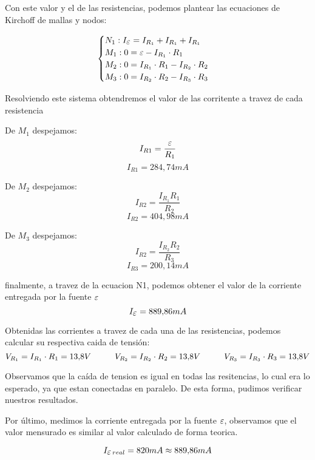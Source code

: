 \documentclass[12pt]{report}
\newcommand {\LEpsilon}{\mathlarger\varepsilon}
\begin{document}
Con este valor y el de las resistencias, podemos plantear las ecuaciones de Kirchoff de mallas y
nodos:

\[
\begin{cases}
  N_1 : I_{\LEpsilon} = I_{R_1} + I_{R_1} + I_{R_1} \\
  M_1 : 0 = \LEpsilon - I_{R_1} \cdot R_1 \\
  M_2 : 0 = I_{R_1} \cdot R_1 - I_{R_2} \cdot R_2 \\
  M_3 : 0 = I_{R_2} \cdot R_2 - I_{R_3} \cdot R_3
\end{cases}
\]

Resolviendo este sistema obtendremos el valor de las corritente a travez de cada resistencia

\noindent
\begin{minipage}[t]{0.33\textwidth}
  \centering
  De $M_1$ despejamos:
  $$I_{R1} = \frac{\LEpsilon}{R_1}$$
  $$I_{R1} = 284,\!74 mA $$
\end{minipage}
\begin{minipage}[t]{0.33\textwidth}
  \centering
  De $M_2$ despejamos:
  $$I_{R2} = \frac{I_{R_1}R_1}{R_2} $$
  $$I_{R2} = 404,\!98 mA $$
\end{minipage}
\begin{minipage}[t]{0.33\textwidth}
  \centering
  De $M_3$ despejamos:
  $$I_{R2} = \frac{I_{R_2}R_2}{R_3} $$
  $$I_{R3} = 200,\!14 mA $$
\end{minipage}

\vspace{7mm}

finalmente, a travez de la ecuacion N1, podemos obtener el valor de la corriente entregada 
por la fuente $\LEpsilon$
$$I_{\LEpsilon} = 889,\!86 mA$$

Obtenidas las corrientes a travez de cada una de las resistencias, podemos calcular su respectiva
caida de tensión:
$$ V_{R_1} = I_{R_1} \cdot R_1 = 13,\!8V \hspace{10mm} V_{R_2} = I_{R_2} \cdot R_2 = 13,\!8V 
\hspace{10mm} V_{R_3} = I_{R_3} \cdot R_3 = 13,\!8V $$

Observamos que la caída de tension es igual en todas las resitencias, lo cual era lo esperado, ya
que estan conectadas en paralelo. De esta forma, pudimos verificar nuestros resultados.

Por último, medimos la corriente entregada por la fuente $\LEpsilon$, observamos que el
valor mensurado es similar al valor calculado de forma teorica.

$$ I_{\LEpsilon \hspace{0,5mm} real} = 820mA \approx 889,\!86 mA $$
\end{document}
